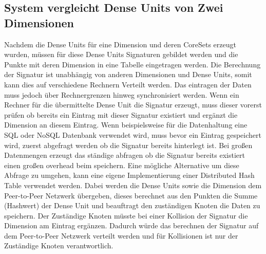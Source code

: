 \subsection{System vergleicht Dense Units von Zwei Dimensionen}

Nachdem die Dense Units für eine Dimension und deren CoreSets erzeugt wurden, müssen für diese Dense Units Signaturen gebildet werden und die Punkte mit deren Dimension in eine Tabelle eingetragen werden. Die Berechnung der Signatur ist unabhängig von anderen Dimensionen und Dense Units, somit kann dies auf verschiedene Rechnern Verteilt werden. Das eintragen der Daten muss jedoch über Rechnergrenzen hinweg synchronisiert werden. Wenn ein Rechner für die übermittelte Dense Unit die Signatur erzeugt, muss dieser vorerst prüfen ob bereits ein Eintrag mit dieser Signatur existiert und ergänzt die Dimension an diesem Eintrag. Wenn beispielsweise für die Datenhaltung eine SQL oder NoSQL Datenbank verwendet wird, muss bevor ein Eintrag gespeichert wird, zuerst abgefragt werden ob die Signatur bereits hinterlegt ist. Bei großen Datenmengen erzeugt das ständige abfragen ob die Signatur bereits existiert einen großen overhead beim speichern. Eine mögliche Alternative um diese Abfrage zu umgehen, kann eine eigene Implementierung einer Distributed Hash Table verwendet werden. Dabei werden die Dense Units sowie die Dimension dem Peer-to-Peer Netzwerk übergeben, dieses berechnet aus den Punkten die Summe (Hashwert) der Dense Unit und beauftragt den zuständigen Knoten die Daten zu speichern. Der Zuständige Knoten müsste bei einer Kollision der Signatur die Dimension am Eintrag ergänzen. Dadurch würde das berechnen der Signatur auf dem Peer-to-Peer Netzwerk verteilt werden und für Kollisionen ist nur der Zuständige Knoten verantwortlich.